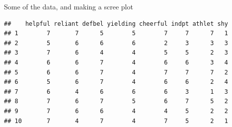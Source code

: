 \begin{frame}[fragile]{Some of the data, and making a scree plot}

  {\footnotesize
\begin{knitrout}
\color{fgcolor}\begin{kframe}
\begin{alltt}
\hlkwb{=}\hlstd{(}\hlstd{,}
\hlstd{bem[}\hlopt{:}\hlstd{,}\hlopt{:}\hlstd{]}
\end{alltt}
\begin{verbatim}
##    helpful reliant defbel yielding cheerful indpt athlet shy
## 1        7       7      5        5        7     7      7   1
## 2        5       6      6        6        2     3      3   3
## 3        7       6      4        4        5     5      2   3
## 4        6       6      7        4        6     6      3   4
## 5        6       6      7        4        7     7      7   2
## 6        5       6      7        4        6     6      2   4
## 7        6       4      6        6        6     3      1   3
## 8        7       6      7        5        6     7      5   2
## 9        7       6      6        4        4     5      2   2
## 10       7       4      7        4        7     5      2   1
\end{verbatim}
\begin{alltt}
\hlkwb{=}\hlstd{(bem[,}\hlopt{-}\hlstd{],}
\end{alltt}
\end{kframe}
\end{knitrout}
}

\begin{knitrout}
\color{fgcolor}\begin{kframe}
\begin{alltt}
\hlopt{$}\hlopt{^}\hlstd{,}\hlstd{=}\hlstd{)}
\hlstd{(}\hlstd{=}\hlstd{,}\hlstd{=}\hlstd{)}
\end{alltt}
\end{kframe}
\end{knitrout}

\end{frame}

